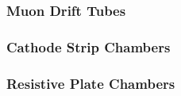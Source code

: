 \subsubsection{Muon Drift Tubes}
\label{sec:DT}

\subsubsection{Cathode Strip Chambers}
\label{sec:CSC}

\subsubsection{Resistive Plate Chambers}
\label{sec:RPC}




